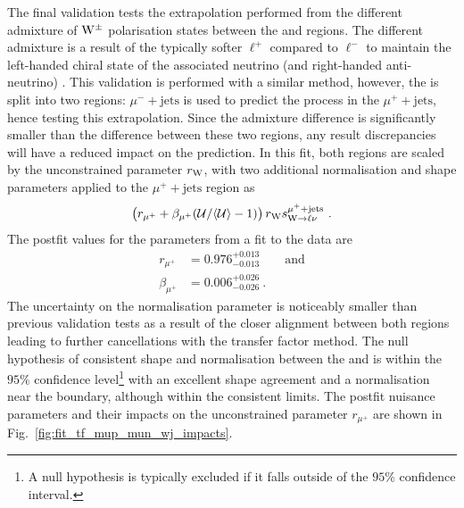 The final validation tests the extrapolation performed from the different admixture of $\mathrm{W}^{\pm}$ polarisation states between the \ellplusjets and \metplusjets regions. The different admixture is a result of the typically softer $\ell^+$ \pt compared to $\ell^-$ \pt to maintain the left-handed chiral state of the associated neutrino (and right-handed anti-neutrino) \cite{Bern:2011ie}. This validation is performed with a similar method, however, the \muplusjets is split into two regions: $\mu^- +\mathrm{jets}$ is used to predict the \IWj process in the $\mu^+ + \mathrm{jets}$, hence testing this extrapolation. Since the admixture difference is significantly smaller than the difference between these two regions, any result discrepancies will have a reduced impact on the \IWj prediction. In this fit, both regions are scaled by the unconstrained parameter $r_\mathrm{W}$, with two additional normalisation and shape parameters applied to the $\mu^+ +\mathrm{jets}$ region as
%
\begin{equation}
    \left(r_{\mu^+} + \beta_{\mu^+}(\mathcal{U}/\langle\mathcal{U}\rangle-1)\right)r_\mathrm{W} s_{{\mathrm{W}\rightarrow \ell\nu}}^{\mu^++\mathrm{jets}}\ .
\end{equation}
%
The postfit values for the parameters from a fit to the data are
%
\begin{align}
    r_{\mu^+} & = 0.976^{+0.013}_{-0.013}\qquad\mathrm{and}\nonumber\\
    \beta_{\mu^+} & = 0.006^{+0.026}_{-0.026}\ .
\end{align}
%
The uncertainty on the normalisation parameter is noticeably smaller than previous validation tests as a result of the closer alignment between both regions leading to further cancellations with the transfer factor method. The null hypothesis of consistent shape and normalisation between the \mupplusjets and \munplusjets is within the $95\%$ confidence level\footnote{A null hypothesis is typically excluded if it falls outside of the $95\%$ confidence interval.} with an excellent shape agreement and a normalisation near the boundary, although within the consistent limits. The postfit nuisance parameters and their impacts on the unconstrained parameter $r_{\mu^+}$ are shown in Fig.~\ref{fig:fit_tf_mup_mun_wj_impacts}.
%
